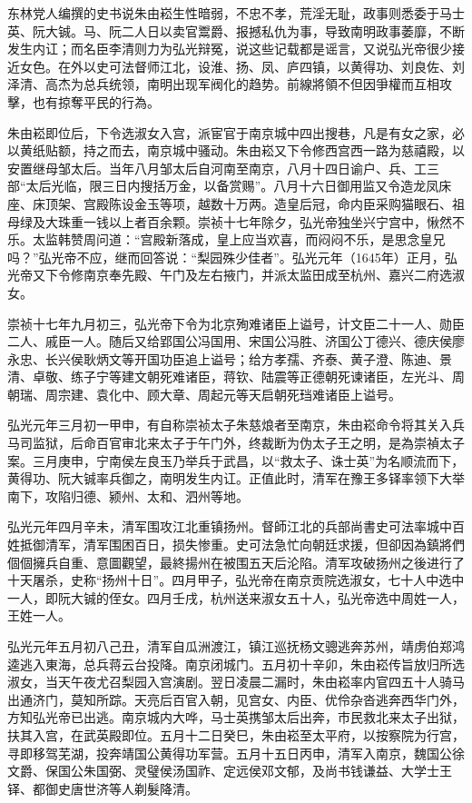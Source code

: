 东林党人编撰的史书说朱由崧生性暗弱，不忠不孝，荒淫无耻，政事则悉委于马士英、阮大铖。马、阮二人日以卖官鬻爵、报撼私仇为事，导致南明政事萎靡，不断发生内讧；而名臣李清则力为弘光辩冤，说这些记载都是谣言，又说弘光帝很少接近女色。在外以史可法督师江北，设淮、扬、凤、庐四镇，以黄得功、刘良佐、刘泽清、高杰为总兵统领，南明出现军阀化的趋势。前線將領不但因爭權而互相攻擊，也有掠奪平民的行為。

朱由崧即位后，下令选淑女入宫，派宦官于南京城中四出搜巷，凡是有女之家，必以黄纸贴额，持之而去，南京城中骚动。朱由崧又下令修西宫西一路为慈禧殿，以安置继母邹太后。当年八月邹太后自河南至南京，八月十四日谕户、兵、工三部“太后光临，限三日内搜括万金，以备赏赐”。八月十六日御用监又令造龙凤床座、床顶架、宫殿陈设金玉等项，越数十万两。造皇后冠，命内臣采购猫眼石、祖母绿及大珠重一钱以上者百余颗。崇祯十七年除夕，弘光帝独坐兴宁宫中，愀然不乐。太监韩赞周问道：“宫殿新落成，皇上应当欢喜，而闷闷不乐，是思念皇兄吗？”弘光帝不应，继而回答说：“梨园殊少佳者”。弘光元年（1645年）正月，弘光帝又下令修南京奉先殿、午门及左右掖门，并派太监田成至杭州、嘉兴二府选淑女。

崇祯十七年九月初三，弘光帝下令为北京殉难诸臣上谥号，计文臣二十一人、勋臣二人、戚臣一人。随后又给郢国公冯国用、宋国公冯胜、济国公丁德兴、德庆侯廖永忠、长兴侯耿炳文等开国功臣追上谥号；给方孝孺、齐泰、黄子澄、陈迪、景清、卓敬、练子宁等建文朝死难诸臣，蒋钦、陆震等正德朝死谏诸臣，左光斗、周朝瑞、周宗建、袁化中、顾大章、周起元等天启朝死珰难诸臣上谥号。

弘光元年三月初一甲申，有自称崇祯太子朱慈烺者至南京，朱由崧命令将其关入兵马司监狱，后命百官审北来太子于午门外，终裁断为伪太子王之明，是為崇禎太子案。三月庚申，宁南侯左良玉乃举兵于武昌，以“救太子、诛士英”为名顺流而下，黄得功、阮大铖率兵御之，南明发生内讧。正值此时，清军在豫王多铎率领下大举南下，攻陷归德、颍州、太和、泗州等地。

弘光元年四月辛未，清军围攻江北重镇扬州。督師江北的兵部尚書史可法率城中百姓抵御清军，清军围困百日，损失惨重。史可法急忙向朝廷求援，但卻因為鎮將們個個擁兵自重、意圖觀望，最終揚州在被围五天后沦陷。清军攻破扬州之後进行了十天屠杀，史称“扬州十日”。四月甲子，弘光帝在南京贡院选淑女，七十人中选中一人，即阮大铖的侄女。四月壬戌，杭州送来淑女五十人，弘光帝选中周姓一人，王姓一人。

弘光元年五月初八己丑，清军自瓜洲渡江，镇江巡抚杨文骢逃奔苏州，靖虏伯郑鸿逵逃入東海，总兵蒋云台投降。南京闭城门。五月初十辛卯，朱由崧传旨放归所选淑女，当天午夜尤召梨园入宫演剧。翌日凌晨二漏时，朱由崧率内官四五十人骑马出通济门，莫知所踪。天亮后百官入朝，见宫女、内臣、优伶杂沓逃奔西华门外，方知弘光帝已出逃。南京城内大哗，马士英携邹太后出奔，市民救北来太子出狱，扶其入宫，在武英殿即位。五月十二日癸巳，朱由崧至太平府，以按察院为行宫，寻即移驾芜湖，投奔靖国公黄得功军营。五月十五日丙申，清军入南京，魏国公徐文爵、保国公朱国弼、灵璧侯汤国祚、定远侯邓文郁，及尚书钱谦益、大学士王铎、都御史唐世济等人剃髮降清。

